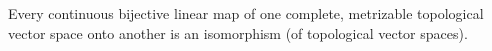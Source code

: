 Every continuous bijective linear map of one complete, metrizable topological vector space onto another is an isomorphism (of topological vector spaces).
